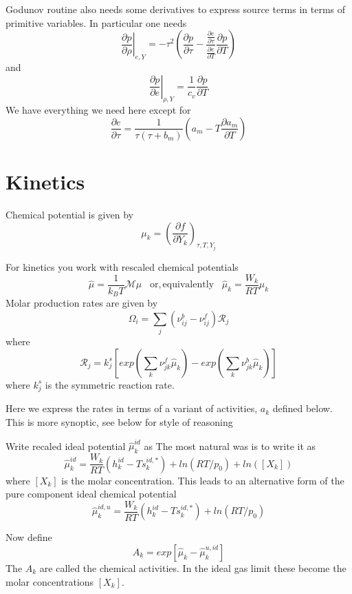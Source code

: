 \documentclass[11pt]{article}
\begin{document}
Godunov routine also needs some derivatives to express source terms in terms of primitive
variables.  
In particular one needs
\[
\left . \frac{\partial p}{\partial \rho} \right|_{e,Y} =
-\tau^2 \left( 
\frac{\partial p}{\partial \tau}
- \frac {\frac{\partial e}{\partial \tau}} 
 {\frac{\partial e}{\partial T}}
\frac{\partial p}{\partial T} \right )
\]
and
\[
\left . \frac{\partial p}{\partial e} \right|_{\rho,Y} = \frac{1}{c_v} 
\frac{\partial p}{\partial T}
\]
We have everything we need here except for
\[
\frac{\partial e}{\partial \tau} = 
\frac{1}{\tau ( \tau + b_m)}
\left( a_m - T  \frac{\partial a_m}{\partial T}  \right)
\]


\section{Kinetics}
\label{sec:kinetics}
Chemical potential is given by
\[
\label{eq:NIpotential}
\mu_k = \left( \frac{\partial f}{\partial Y_k}\right)_{\tau,T,Y_j}
\]

For kinetics you work with rescaled chemical potentials
\[
\hat{\mu} = \frac{1}{k_B T} \mathcal{M} \mu \;\;\;  \mathrm{or, equivalently} \;\;\;  
\hat{\mu}_k = \frac{W_k}{R T} \mu_k
\]
Molar production rates are given by
\[
\Omega_i = \sum_j (\nu_{ij}^b - \nu_{ij}^f) \mathcal{R}_j
\]
where 
\[
\mathcal{R}_j = k_j^s \left [ exp(\sum_k \nu_{jk}^f \hat{\mu}_k) - exp (\sum_k  \nu_{jk}^b \hat{\mu}_k) \right ] 
\]
where $k_j^s$ is the symmetric reaction rate.

Here we express the rates in terms of a variant of activities, $a_k$ defined below.
This is more synoptic, see below for style of reasoning

Write recaled ideal potential  $\hat{\mu}_k^{id}$ as
The most natural was is to write it as
\begin{equation}
\hat{\mu}_k^{id} = \frac{W_k}{R T} (h_k^{id} - T s_k^{id,*} )+ ln(RT/p_0) + ln([X_k])
\end{equation}
where $[X_k]$ is the molar concentration.
This leads to an alternative form of the pure component ideal chemical potential
\begin{equation}
\hat{\mu}_k^{id,u} = \frac{W_k}{R T} (h_k^{id} - T s_k^{id,*} )+ ln(RT/p_0) 
\label{eq:chem_uid_conc}
\end{equation}

Now define
\begin{equation}
A_k = exp[\hat{\mu}_k - \hat{\mu}_k^{u,id}]
\label{eq:deviate_ideal}
\end{equation}
The $A_k$ are called the chemical activities.
In the ideal gas limit these become the molar concentrations $[X_k]$.
\end{document}
